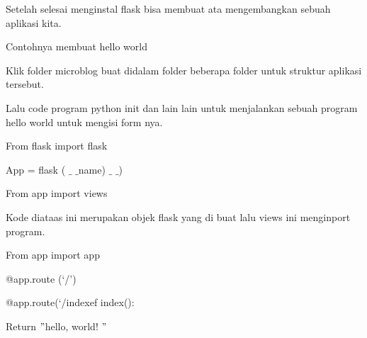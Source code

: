 {{{{\noindent
{\fontsize{14pt}{14pt}\selectfont Setelah selesai menginstal flask bisa membuat ata mengembangkan sebuah aplikasi kita.  \\} \par
\noindent
{\fontsize{14pt}{14pt}\selectfont Contohnya membuat hello world \\} \par
\noindent
{\fontsize{14pt}{14pt}\selectfont Klik folder microblog buat didalam folder beberapa folder untuk struktur aplikasi tersebut. \\} \par
\vspace{14pt}
\noindent
{\fontsize{14pt}{14pt}\selectfont Lalu code program python init dan lain lain untuk menjalankan sebuah program hello world untuk mengisi form nya. \\} \par
\noindent
{\fontsize{14pt}{14pt}\selectfont From flask import flask \\} \par
\vspace{14pt}
\noindent
{\fontsize{14pt}{14pt}\selectfont App = flask ( $  \_  $ $  \_  $name) $  \_  $ $  \_  $) \\} \par
\vspace{14pt}
\noindent
{\fontsize{14pt}{14pt}\selectfont From app import views \\} \par
\vspace{14pt}
\noindent
{\fontsize{14pt}{14pt}\selectfont Kode diataas ini merupakan objek flask yang di buat lalu views ini menginport program. \\} \par
\vspace{14pt}
\noindent
{\fontsize{14pt}{14pt}\selectfont From app import app \\} \par
\vspace{14pt}
\noindent
{\fontsize{14pt}{14pt}\selectfont @app.route (‘/’) \\} \par
\vspace{14pt}
\noindent
{\fontsize{14pt}{14pt}\selectfont @app.route(‘/indexef index(): \\} \par
\vspace{14pt}
\noindent
{\fontsize{14pt}{14pt}\selectfont Return  $ " $hello, world! $ " $ \\} \par
}}}}
